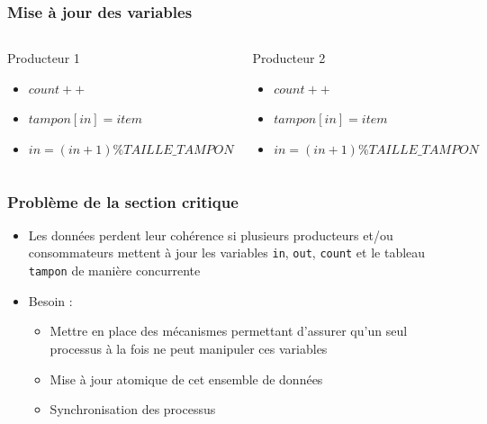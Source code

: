 \begin{frame}
\frametitle{Mise à jour des variables}

\begin{columns}
\begin{block}{Producteur 1}
\begin{itemize}
\item $count++$
\item $tampon[in] = item$
\item $in = (in + 1) \% TAILLE\_TAMPON$
\end{itemize}
\end{block}

\begin{block}{Producteur 2}
\begin{itemize}
\item $count++$
\item $tampon[in] = item$
\item $in = (in + 1) \% TAILLE\_TAMPON$
\end{itemize}
\end{block}
\end{columns}
\end{frame}

\begin{frame}
\frametitle{Problème de la section critique}
\begin{itemize}
\item Les données perdent leur cohérence si plusieurs producteurs et/ou consommateurs mettent à jour les variables \texttt{in}, \texttt{out}, \texttt{count} et le tableau \texttt{tampon} de manière concurrente
\item Besoin :
\begin{itemize}
\item Mettre en place des mécanismes permettant d’assurer qu’un seul processus à la fois ne peut manipuler ces variables
\item Mise à jour atomique de cet ensemble de données
\item Synchronisation des processus
\end{itemize}
\end{itemize}
\end{frame}


